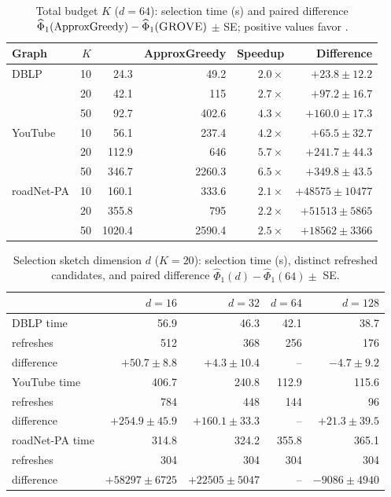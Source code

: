 \begin{table}[t]
\centering\footnotesize
\caption{Total budget $K$ ($d=64$): selection time (s) and paired
difference $\widehat\Phi_1(\text{ApproxGreedy})-\widehat\Phi_1(\textsc{GROVE}{})$
$\pm$ SE; positive values favor \alg{}.}\label{tab:ksweep}
\setlength{\tabcolsep}{3.5pt}
\begin{tabular}{@{}lrrrrr@{}}\toprule
Graph & $K$ & \alg{} & ApproxGreedy & Speedup & Difference\\\midrule
DBLP & 10 & 24.3 & 49.2 & $2.0\times$ & $+23.8\pm12.2$\\
 & 20 & 42.1 & 115 & $2.7\times$ & $+97.2\pm16.7$\\
 & 50 & 92.7 & 402.6 & $4.3\times$ & $+160.0\pm17.3$\\\midrule
YouTube & 10 & 56.1 & 237.4 & $4.2\times$ & $+65.5\pm32.7$\\
 & 20 & 112.9 & 646 & $5.7\times$ & $+241.7\pm44.3$\\
 & 50 & 346.7 & 2260.3 & $6.5\times$ & $+349.8\pm43.5$\\\midrule
roadNet-PA & 10 & 160.1 & 333.6 & $2.1\times$ & $+48575\pm10477$\\
 & 20 & 355.8 & 795 & $2.2\times$ & $+51513\pm5865$\\
 & 50 & 1020.4 & 2590.4 & $2.5\times$ & $+18562\pm3366$\\
\bottomrule\end{tabular}
\end{table}

\begin{table}[t]
\centering\footnotesize
\caption{Selection sketch dimension $d$ ($K=20$): selection time
(s), distinct refreshed candidates, and paired difference
$\widehat\Phi_1(d)-\widehat\Phi_1(64)\pm$ SE.}\label{tab:dsweep}
\setlength{\tabcolsep}{3pt}
\begin{tabular}{@{}lrrrr@{}}\toprule
& $d=16$ & $d=32$ & $d=64$ & $d=128$\\\midrule
DBLP time & 56.9 & 46.3 & 42.1 & 38.7\\
\quad refreshes & 512 & 368 & 256 & 176\\
\quad difference & $+50.7\pm8.8$ & $+4.3\pm10.4$ & -- & $-4.7\pm9.2$\\\midrule
YouTube time & 406.7 & 240.8 & 112.9 & 115.6\\
\quad refreshes & 784 & 448 & 144 & 96\\
\quad difference & $+254.9\pm45.9$ & $+160.1\pm33.3$ & -- & $+21.3\pm39.5$\\\midrule
roadNet-PA time & 314.8 & 324.2 & 355.8 & 365.1\\
\quad refreshes & 304 & 304 & 304 & 304\\
\quad difference & $+58297\pm6725$ & $+22505\pm5047$ & -- & $-9086\pm4940$\\
\bottomrule\end{tabular}
\end{table}

